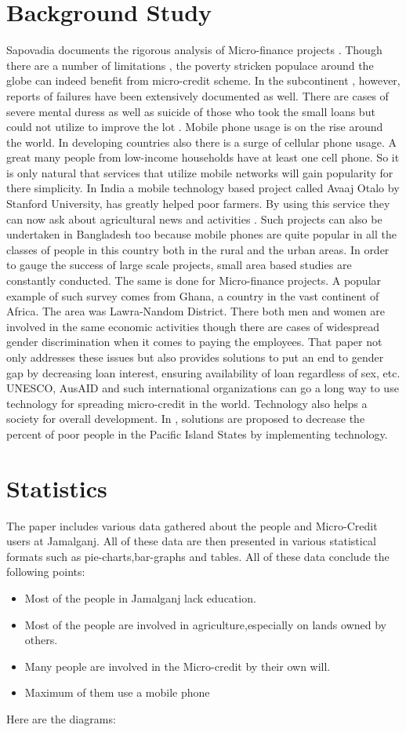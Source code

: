 \documentclass{report}
\begin{document}
\chapter{Background Study}
Sapovadia documents the rigorous analysis of Micro-finance projects \cite{7}.  Though there are a number of limitations , the poverty stricken populace around the globe can indeed benefit from micro-credit scheme\cite{8}.  In the subcontinent , however, reports of failures have been extensively documented as well\cite{9}. There  are cases of severe mental duress as well as suicide of those who took the small loans but could not utilize to improve the lot \cite{10}. 
Mobile phone usage is on the rise around the world. In developing countries also there is a surge of cellular phone usage. A great many people from low-income households have at least one cell phone. So it is only natural that services that utilize mobile networks will gain popularity for there simplicity. In India a mobile technology based project called Avaaj Otalo by Stanford University, has greatly helped poor farmers. By using this service they can now ask about agricultural news and activities \cite{11}. 
Such projects can also be undertaken in Bangladesh too because mobile phones are quite popular in all the classes of people in this country both in the rural and the urban areas.
In order to gauge the success of large scale projects, small area based studies are constantly conducted. The same is done for Micro-finance projects. A popular example of such survey comes from Ghana, a country in the vast continent of Africa. The area was Lawra-Nandom District. There both men and women are involved in the same economic activities though there are cases of widespread gender discrimination when it comes to paying the employees. That paper not only addresses these issues but also provides solutions to put an end to gender gap by decreasing loan interest, ensuring availability of loan regardless of sex, etc.
UNESCO, AusAID and such international organizations can go a long way to use technology for spreading micro-credit in the world. Technology also helps a society for overall development. In \cite{12},  solutions are proposed to decrease the percent of poor people in the Pacific Island States by implementing technology.
\newpage

\chapter{Statistics}
The paper includes various data gathered about the people and Micro-Credit users at Jamalganj. All of these data are then presented in various statistical formats such as pie-charts,bar-graphs and tables.
All of these data conclude the following points:
\begin{itemize}
\item Most of the people in Jamalganj lack education.
\item Most of the people are involved in agriculture,especially on lands owned by others.
\item Many people are involved in the Micro-credit by their own will.
\item Maximum of them use a mobile phone
\end{itemize}
Here are the diagrams:
\end{document}
